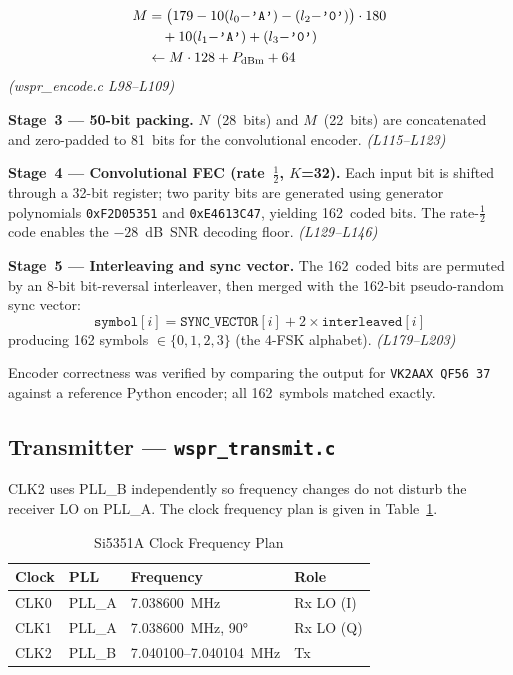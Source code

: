 \documentclass[conference]{IEEEtran}
\begin{document}
\begin{align}
  M &= \bigl(179 - 10(l_0{-}\texttt{'A'}) 
           - (l_2{-}\texttt{'0'})\bigr)\cdot 180 \notag \\
    &\quad + 10(l_1{-}\texttt{'A'}) + (l_3{-}\texttt{'0'}) \notag \\
    &\leftarrow M \cdot 128 + P_\text{dBm} + 64
  \label{eq:grid}
\end{align}
\textit{(wspr\_encode.c L98--L109)}

\textbf{Stage~3 --- 50-bit packing.} $N$~(28~bits) and $M$~(22~bits) are
concatenated and zero-padded to 81~bits for the convolutional encoder.
\textit{(L115--L123)}

\textbf{Stage~4 --- Convolutional FEC (rate~$\frac{1}{2}$, $K$=32).} Each input
bit is shifted through a 32-bit register; two parity bits are generated using
generator polynomials \texttt{0xF2D05351} and \texttt{0xE4613C47}, yielding
162~coded bits. The rate-$\frac{1}{2}$ code enables the $-28$~dB~SNR decoding
floor. \textit{(L129--L146)}

\textbf{Stage~5 --- Interleaving and sync vector.} The 162~coded bits are
permuted by an 8-bit bit-reversal interleaver, then merged with the 162-bit
pseudo-random sync vector:
%
\begin{equation}
  \texttt{symbol}[i]
    = \texttt{SYNC\_VECTOR}[i] + 2 \times \texttt{interleaved}[i]
  \label{eq:sync}
\end{equation}
%
producing 162 symbols $\in \{0,1,2,3\}$ (the 4-FSK alphabet).
\textit{(L179--L203)}

Encoder correctness was verified by comparing the output for
\texttt{VK2AAX QF56 37} against a reference Python encoder; all 162~symbols
matched exactly.

\subsection{Transmitter --- \texttt{wspr\_transmit.c}}

CLK2 uses PLL\_B independently so frequency changes do not disturb the receiver
LO on PLL\_A. The clock frequency plan is given in Table~\ref{tab:clocks}.

\begin{table}[t]
  \centering
  \caption{Si5351A Clock Frequency Plan}
  \label{tab:clocks}
  \begin{tabular}{llll}
    \toprule
    Clock & PLL & Frequency & Role \\
    \midrule
    CLK0 & PLL\_A & 7.038600~MHz       & Rx LO (I) \\
    CLK1 & PLL\_A & 7.038600~MHz, 90°  & Rx LO (Q) \\
    CLK2 & PLL\_B & 7.040100--7.040104~MHz & Tx \\
    \bottomrule
  \end{tabular}
\end{table}
\end{document}
